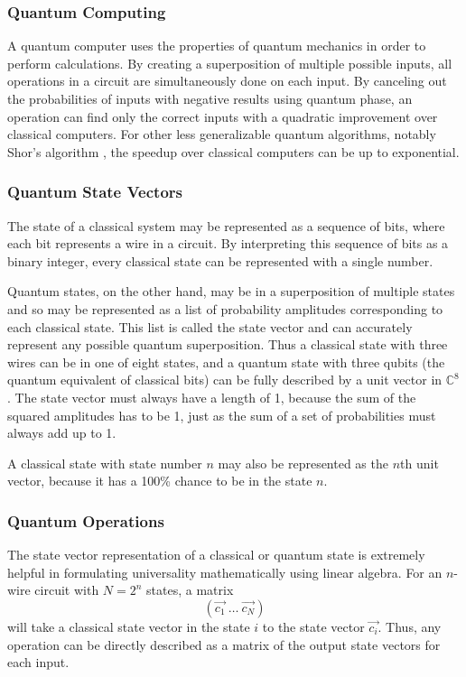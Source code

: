 \documentclass[12pt]{article}
\begin{document}
\subsubsection{Quantum Computing}
A quantum computer uses the properties of quantum mechanics in order to perform calculations. By creating a superposition of multiple possible inputs, all operations in a circuit are simultaneously done on each input. By canceling out the probabilities of inputs with negative results using quantum phase, an operation can find only the correct inputs with a quadratic improvement over classical computers. For other less generalizable quantum algorithms, notably Shor's algorithm
\cite{Shor1997}
, the speedup over classical computers can be up to exponential.

\subsubsection{Quantum State Vectors}
The state of a classical system may be represented as a sequence of bits, where each bit represents a wire in a circuit. By interpreting this sequence of bits as a binary integer, every classical state can be represented with a single number.

Quantum states, on the other hand, may be in a superposition of multiple states and so may be represented as a list of probability amplitudes corresponding to each classical state. This list is called the state vector and can accurately represent any possible quantum superposition. Thus a classical state with three wires can be in one of eight states, and a quantum state with three qubits (the quantum equivalent of classical bits) can be fully described by a unit vector in $\mathbb{C}^8$. The state vector must always have a length of 1, because the sum of the squared amplitudes has to be 1, just as the sum of a set of probabilities must always add up to 1.

A classical state with state number $n$ may also be represented as the $n$th unit vector, because it has a 100\% chance to be in the state $n$.

\subsubsection{Quantum Operations}
The state vector representation of a classical or quantum state is extremely helpful in formulating universality mathematically using linear algebra. For an $n$-wire circuit with $N=2^n$ states, a matrix
$$
(\vec{c_{1}} \: \dots \: \vec{c_{N}})
$$
will take a classical state vector in the state $i$ to the state vector $\vec{c_{i}}$. Thus, any operation can be directly described as a matrix of the output state vectors for each input.
\end{document}
